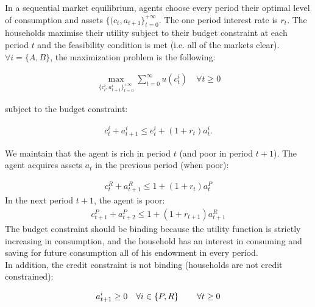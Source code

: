 \documentclass{article}
\begin{document}
In a sequential market equilibrium, agents choose every period their optimal level of consumption and assets $\{(c_t, a_{t+1}\}^{+\infty}_{t=0}$. The one period interest rate is $r_t$. The households maximise their utility subject to their budget constraint at each period $t$ and the feasibility condition is met (i.e. all of the markets clear).\\

$\forall i=\{A,B\}$, the maximization problem is the following:

\begin{gather*}
    \max_{\{c_t^i, a_{t+1}^i\}^{+\infty}_{t=0}}\sum_{t=0}^{\infty}u(c_t^i)\quad\forall t \geq 0
\end{gather*}

subject to the budget constraint:

\begin{gather*}
    c_t^i+a^i_{t+1}\leq e_t^i+(1+r_t)a_t^i.
\end{gather*}

We maintain that the agent is rich in period $t$ (and poor in period $t+1$). The agent acquires assets $a_t$ in the previous period (when poor):

\begin{gather*}
    c_t^R+a^R_{t+1}\leq 1+(1+r_t)a_t^P
\end{gather*}
In the next period $t+1$, the agent is poor:\\
\begin{gather*}
    c_{t+1}^P+a^P_{t+2}\leq 1+(1+r_{t+1})a_{t+1}^R
\end{gather*}
The budget constraint should be binding because the utility function is strictly increasing in consumption, and the household has an interest in consuming and saving for future consumption all of his endowment in every period.\\


In addition, the credit constraint is not binding (households are not credit constrained):

\begin{gather*}
    a_{t+1}^i\geq0\quad\forall i\in\{P,R\} \mbox{\hspace{0.3in}} \forall t \geq 0 \\
\end{gather*}
\end{document}
